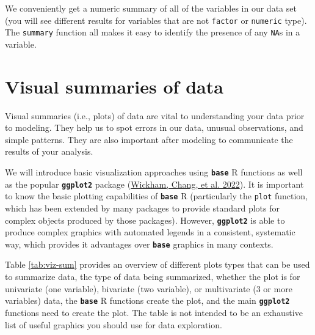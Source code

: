\documentclass[
]{book}
\theoremstyle{definition}
\theoremstyle{definition}
\theoremstyle{definition}
\theoremstyle{definition}
\theoremstyle{remark}
\begin{document}
We conveniently get a numeric summary of all of the variables in our data set (you will see different results for variables that are not \texttt{factor} or \texttt{numeric} type). The \texttt{summary} function all makes it easy to identify the presence of any \texttt{NA}s in a variable.

\hypertarget{visual-summaries-of-data}{%
\section{Visual summaries of data}\label{visual-summaries-of-data}}

Visual summaries (i.e., plots) of data are vital to understanding your data prior to modeling. They help us to spot errors in our data, unusual observations, and simple patterns. They are also important after modeling to communicate the results of your analysis.

We will introduce basic visualization approaches using \textbf{\texttt{base}} R functions as well as the popular \textbf{\texttt{ggplot2}} package (\protect\hyperlink{ref-R-ggplot2}{Wickham, Chang, et al. 2022}). It is important to know the basic plotting capabilities of \textbf{\texttt{base}} R (particularly the \texttt{plot} function, which has been extended by many packages to provide standard plots for complex objects produced by those packages). However, \textbf{\texttt{ggplot2}} is able to produce complex graphics with automated legends in a consistent, systematic way, which provides it advantages over \textbf{\texttt{base}} graphics in many contexts.

Table \ref{tab:viz-sum} provides an overview of different plots types that can be used to summarize data, the type of data being summarized, whether the plot is for univariate (one variable), bivariate (two variable), or multivariate (3 or more variables) data, the \textbf{\texttt{base}} R functions create the plot, and the main \textbf{\texttt{ggplot2}} functions need to create the plot. The table is not intended to be an exhaustive list of useful graphics you should use for data exploration.
\end{document}
